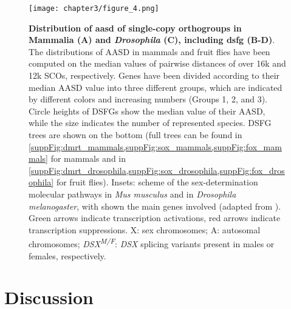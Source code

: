 \begin{figure}[t!]
	\centering
	\texttt{[image: chapter3/figure\_4.png]}
	\captionsetup[subfigure]{labelformat=nocaption}
	\begin{subfigure}{0\linewidth}
	\caption{}\label{fig:DSFG_testDivergence-A}
	\end{subfigure}%
	\begin{subfigure}{0\linewidth}
	\caption{}\label{fig:DSFG_testDivergence-B}
	\end{subfigure}%
	\begin{subfigure}{0\linewidth}
	\caption{}\label{fig:DSFG_testDivergence-C}
	\end{subfigure}%
	\begin{subfigure}{0\linewidth}
	\caption{}\label{fig:DSFG_testDivergence-D}
	\end{subfigure}
	\caption[\textbf{Distribution of \gls{aasd} of single-copy orthogroups in Mammalia (A) and \textit{Drosophila} (C), including \gls{dsfg} (B-D)}]
	{
		\textbf{Distribution of \gls{aasd} of single-copy orthogroups in Mammalia (A) and \textit{Drosophila} (C), including \gls{dsfg} (B-D)}. The distributions of AASD in mammals and fruit flies have been computed on the median values of pairwise distances of over 16k and 12k SCOs, respectively. Genes have been divided according to their median AASD value into three different groups, which are indicated by different colors and increasing numbers (Groups 1, 2, and 3). Circle heights of DSFGs show the median value of their AASD, while the size indicates the number of represented species. DSFG trees are shown on the bottom (full trees can be found in \cref{suppFig:dmrt_mammals,suppFig:sox_mammals,suppFig:fox_mammals} for mammals and in \cref{suppFig:dmrt_drosophila,suppFig:sox_drosophila,suppFig:fox_drosophila} for fruit flies). Insets: scheme of the sex-determination molecular pathways in \textit{Mus musculus} and in \textit{Drosophila melanogaster}, with shown the main genes involved (adapted from ). Green arrows indicate transcription activations, red arrows indicate transcription suppressions. X: sex chromosomes; A: autosomal chromosomes; \textit{DSX\textsuperscript{M/F}}: \textit{DSX} splicing variants present in males or females, respectively.
	}
	\label{fig:DSFG_testDivergence}
\end{figure}

\section{Discussion} \label{chpater3_discussion}
